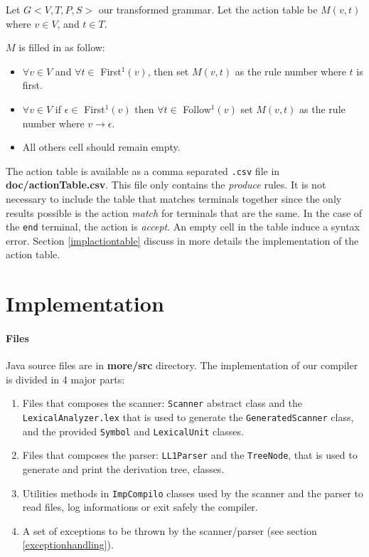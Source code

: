 \documentclass[letterpaper]{article}
\begin{document}
Let $G<V, T, P, S>$ our transformed grammar.
Let the action table be $M(v, t)$ where
$v \in V$, and $t \in T$.

$M$ is filled in as follow:
\begin{itemize}
    \item $\forall v \in V$ and $\forall t \in$ First$^1(v)$,
    then set $M(v, t)$ as the rule number where $t$ is first.
    \item $\forall v \in V$ if $\epsilon \in $ First$^1(v)$ then
    $\forall t \in$ Follow$^1(v)$ set $M(v, t)$ as the rule number
    where $v \rightarrow \epsilon$.
    \item All others cell should remain empty.
\end{itemize}

The action table is available as a comma separated \texttt{.csv} file in
\textbf{doc/actionTable.csv}. This file only contains the
\textit{produce} rules.
It is not necessary to include the table that matches terminals together
since the only results possible is the action \textit{match}
for terminals that are the same.
In the case of the \texttt{end} terminal, the action is \textit{accept}.
An empty cell in the table induce a syntax error.
Section \ref{implactiontable} discuss in more details the implementation
of the action table.

\section{Implementation}


\paragraph{Files} Java source files are in \textbf{more/src} directory.
The implementation of our compiler is divided in 4 major
parts:
\begin{enumerate}
    \item Files that composes the scanner: \texttt{Scanner} abstract
    class and the \texttt{LexicalAnalyzer.lex} that is used to generate
    the \texttt{GeneratedScanner} class, and
    the provided \texttt{Symbol} and \texttt{LexicalUnit} classes.
    \item Files that composes the parser: \texttt{LL1Parser}
    and the \texttt{TreeNode}, that is used to generate and print
    the derivation tree, classes.
    \item Utilities methods in \texttt{ImpCompilo} classes
    used by the scanner and the parser to read
    files, log informations or exit safely the compiler.
    \item A set of exceptions to be thrown by the scanner/parser (see section
    \ref{exceptionhandling}).
\end{enumerate}
\end{document}
